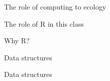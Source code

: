 \documentclass[12pt]{beamer}
\begin{document}
\begin{frame}

  \Large \textcolor{boss1}{The role of computing to ecology}

\end{frame}




\begin{frame}

  \Large \textcolor{boss1}{The role of R in this class}

\end{frame}






\begin{frame}

  \Large \textcolor{boss1}{Why R?}

\end{frame}







\begin{frame}

  \Large \textcolor{boss1}{Data structures}

\end{frame}




\begin{frame}

  \Large \textcolor{boss1}{Data structures}

\end{frame}
\end{document}
